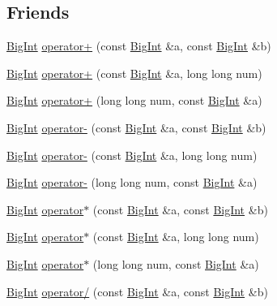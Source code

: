 \subsection*{Friends}
\begin{DoxyCompactItemize}
\item 
\hyperlink{class_big_int}{Big\+Int} \hyperlink{class_big_int_a99b2d896b393bf61492d6a8679053240}{operator+} (const \hyperlink{class_big_int}{Big\+Int} \&a, const \hyperlink{class_big_int}{Big\+Int} \&b)
\item 
\hyperlink{class_big_int}{Big\+Int} \hyperlink{class_big_int_a49094568be86f407d234fcc6f00b184c}{operator+} (const \hyperlink{class_big_int}{Big\+Int} \&a, long long num)
\item 
\hyperlink{class_big_int}{Big\+Int} \hyperlink{class_big_int_a9411c77fc375b6dc692dbb62972dd99e}{operator+} (long long num, const \hyperlink{class_big_int}{Big\+Int} \&a)
\item 
\hyperlink{class_big_int}{Big\+Int} \hyperlink{class_big_int_a83e7a63b3c5d80f2e8941ee13130bf4b}{operator-\/} (const \hyperlink{class_big_int}{Big\+Int} \&a, const \hyperlink{class_big_int}{Big\+Int} \&b)
\item 
\hyperlink{class_big_int}{Big\+Int} \hyperlink{class_big_int_a38fdaadd250b30d28e277fd5adde2e02}{operator-\/} (const \hyperlink{class_big_int}{Big\+Int} \&a, long long num)
\item 
\hyperlink{class_big_int}{Big\+Int} \hyperlink{class_big_int_a06ce9642ecefa2aceecd4b116ba3eb21}{operator-\/} (long long num, const \hyperlink{class_big_int}{Big\+Int} \&a)
\item 
\hyperlink{class_big_int}{Big\+Int} \hyperlink{class_big_int_ad7b8aa42fc035e14b788ecf3ce2bcd75}{operator$\ast$} (const \hyperlink{class_big_int}{Big\+Int} \&a, const \hyperlink{class_big_int}{Big\+Int} \&b)
\item 
\hyperlink{class_big_int}{Big\+Int} \hyperlink{class_big_int_a9e33d5e6cccf7d66e8d32f022b94b3dc}{operator$\ast$} (const \hyperlink{class_big_int}{Big\+Int} \&a, long long num)
\item 
\hyperlink{class_big_int}{Big\+Int} \hyperlink{class_big_int_ad35e3c825312ccddbed451256f43d4a9}{operator$\ast$} (long long num, const \hyperlink{class_big_int}{Big\+Int} \&a)
\item 
\hyperlink{class_big_int}{Big\+Int} \hyperlink{class_big_int_a4f32efafa21a72217064fce4f1b050b3}{operator/} (const \hyperlink{class_big_int}{Big\+Int} \&a, const \hyperlink{class_big_int}{Big\+Int} \&b)
\item 

\end{DoxyCompactItemize}
